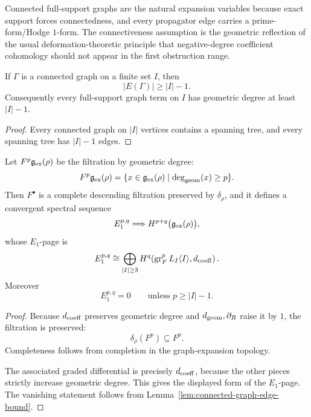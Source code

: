 \begin{remark}
Connected full-support graphs are the natural expansion variables because exact support forces connectedness,
and every propagator edge carries a prime-form/Hodge $1$-form. The connectiveness assumption is the
geometric reflection of the usual deformation-theoretic principle that negative-degree coefficient
cohomology should not appear in the first obstruction range.
\end{remark}

\begin{lemma}
\label{lem:connected-graph-edge-bound}
If $\Gamma$ is a connected graph on a finite set $I$, then
\[
|E(\Gamma)|\ge |I|-1.
\]
Consequently every full-support graph term on $I$ has geometric degree at least $|I|-1$.
\end{lemma}

\begin{proof}
Every connected graph on $|I|$ vertices contains a spanning tree, and every spanning tree has
$|I|-1$ edges.
\end{proof}

\begin{theorem}
\label{thm:geometric-degree-spectral-sequence}
Let $F^p\mathfrak g_{\mathrm{ex}}(\rho)$ be the filtration by geometric degree:
\[
F^p\mathfrak g_{\mathrm{ex}}(\rho)
=
\{x\in \mathfrak g_{\mathrm{ex}}(\rho)\mid \deg_{\mathrm{geom}}(x)\ge p\}.
\]
Then $F^\bullet$ is a complete descending filtration preserved by $\delta_\rho$, and it defines
a convergent spectral sequence
\[
E_1^{p,q}
\Longrightarrow
H^{p+q}\bigl(\mathfrak g_{\mathrm{ex}}(\rho)\bigr),
\]
whose $E_1$-page is
\[
E_1^{p,q}
\cong
\bigoplus_{|I|\ge 3}
H^q\!\left(\operatorname{gr}_F^p L_I\langle I\rangle,d_{\mathrm{coeff}}\right).
\]
Moreover
\[
E_1^{p,q}=0
\qquad\text{unless }p\ge |I|-1.
\]
\end{theorem}

\begin{proof}
Because $d_{\mathrm{coeff}}$ preserves geometric degree and $d_{\mathrm{geom}},\partial_R$ raise it by $1$,
the filtration is preserved:
\[
\delta_\rho(F^p)\subseteq F^p.
\]
Completeness follows from completion in the graph-expansion topology.

The associated graded differential is precisely $d_{\mathrm{coeff}}$, because the other pieces strictly increase
geometric degree. This gives the displayed form of the $E_1$-page. The vanishing statement follows from
Lemma~\ref{lem:connected-graph-edge-bound}.
\end{proof}


